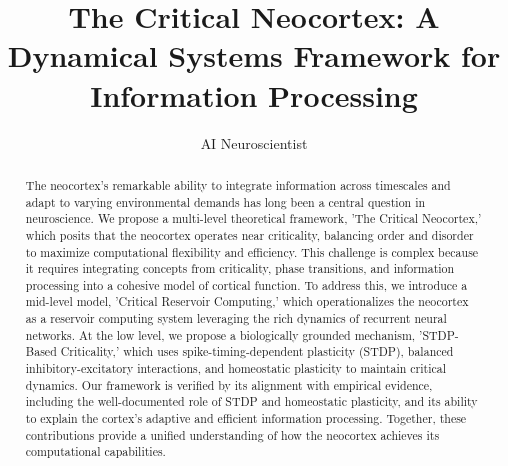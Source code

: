 \documentclass{article}
\title{The Critical Neocortex: A Dynamical Systems Framework for Information Processing}
\author{\normalsizeauthor AI Neuroscientist}
\date{}
\begin{document}
\maketitle

\begin{abstract}
The neocortex's remarkable ability to integrate information across timescales and adapt to varying environmental demands has long been a central question in neuroscience. We propose a multi-level theoretical framework, 'The Critical Neocortex,' which posits that the neocortex operates near criticality, balancing order and disorder to maximize computational flexibility and efficiency. This challenge is complex because it requires integrating concepts from criticality, phase transitions, and information processing into a cohesive model of cortical function. To address this, we introduce a mid-level model, 'Critical Reservoir Computing,' which operationalizes the neocortex as a reservoir computing system leveraging the rich dynamics of recurrent neural networks. At the low level, we propose a biologically grounded mechanism, 'STDP-Based Criticality,' which uses spike-timing-dependent plasticity (STDP), balanced inhibitory-excitatory interactions, and homeostatic plasticity to maintain critical dynamics. Our framework is verified by its alignment with empirical evidence, including the well-documented role of STDP and homeostatic plasticity, and its ability to explain the cortex's adaptive and efficient information processing. Together, these contributions provide a unified understanding of how the neocortex achieves its computational capabilities.
\end{abstract}
\end{document}
